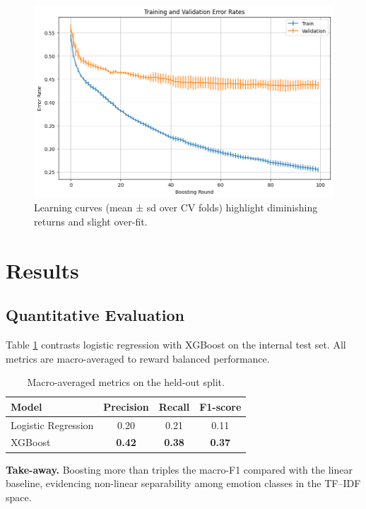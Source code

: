 \documentclass[12pt]{article}
\begin{document}
\begin{figure}[H]
  \centering
  \includegraphics[width=.83\textwidth]{output3.png}
  \caption{Learning curves (mean ± sd over CV folds) highlight diminishing returns and slight over-fit.}
  \label{fig:boosting}
\end{figure}

\section{Results}
\label{sec:results}

\subsection{Quantitative Evaluation}
Table \ref{tab:metrics} contrasts logistic regression with XGBoost on the internal test set.
All metrics are macro-averaged to reward balanced performance.

\begin{table}[H]
\centering
\caption{Macro-averaged metrics on the held-out split.\label{tab:metrics}}
\begin{tabular}{lccc}
\toprule
\textbf{Model} & \textbf{Precision} & \textbf{Recall} & \textbf{F1-score}\\
\midrule
Logistic Regression & 0.20 & 0.21 & 0.11\\
XGBoost             & \textbf{0.42} & \textbf{0.38} & \textbf{0.37}\\
\bottomrule
\end{tabular}
\end{table}

\noindent
\textbf{Take-away.}  
Boosting more than triples the macro-F1 compared with the linear baseline, evidencing
non-linear separability among emotion classes in the TF–IDF space.
\end{document}
